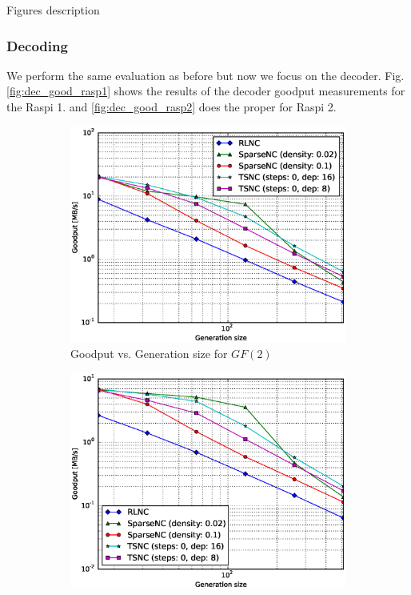 Figures description

\subsubsection{Decoding}

We perform the same evaluation as before but now we focus on the decoder.
Fig. \ref{fig:dec_good_rasp1} shows the results of the decoder goodput
measurements for the \ac{Raspi} 1. and \ref{fig:dec_good_rasp2} does
the proper for \ac{Raspi} 2.

\begin{figure}
    \centering
    \begin{subfigure}[b]{0.475\textwidth}
        \centering
        \includegraphics[width=1.15\textwidth]{images/23_07_2015/goodput_vs_generation_size_Rasp_decoder_Binary_1600.eps}
        \caption[]%
        {{\small Goodput vs. Generation size for $GF(2)$}}    
        \label{fig:dec_good_rasp1_gen_gf2}
    \end{subfigure}
    \hfill
    \begin{subfigure}[b]{0.475\textwidth}  
        \centering 
        \includegraphics[width=1.15\textwidth]{images/23_07_2015/goodput_vs_generation_size_Rasp_decoder_Binary8_1600.eps}

\end{subfigure}
\end{figure}
